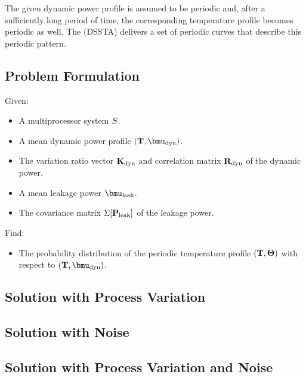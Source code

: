The given dynamic power profile is assumed to be periodic and, after a sufficiently long period of time, the corresponding temperature profile becomes periodic as well. The  (DSSTA) delivers a set of periodic curves that describe this periodic pattern.

\subsection{Problem Formulation}
Given:
\begin{itemize}
  \item A multiprocessor system $S$.
  \item A mean dynamic power profile $\mpprofile{\dyn}$.
  \item The variation ratio vector $\mathbf{K}_{\text{dyn}}$ and correlation matrix $\mathbf{R}_{\text{dyn}}$ of the dynamic power.
  \item A mean leakage power $\vmean{\leak}$.
  \item The covariance matrix $\Sigma[\mathbf{P}_{\text{leak}}]$ of the leakage power.
\end{itemize}

Find:
\begin{itemize}
  \item The probability distribution of the periodic temperature profile $(\mathbf{T}, \mathbf{\Theta})$ with respect to $\mpprofile{\dyn}$.
\end{itemize}

\subsection{Solution with Process Variation} 


\subsection{Solution with Noise} 


\subsection{Solution with Process Variation and Noise} 


